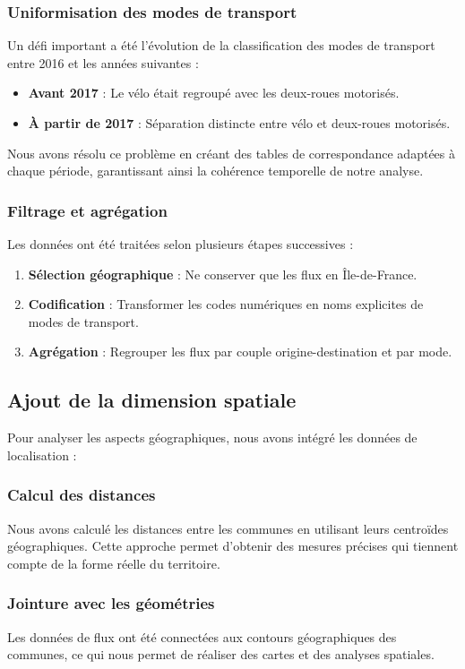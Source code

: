 \documentclass[11pt,a4paper]{article}
\begin{document}
\subsubsection{Uniformisation des modes de transport}
Un défi important a été l'évolution de la classification des modes de transport entre 2016 et les années suivantes :
\begin{itemize}[label=\textbullet]
    \item \textbf{Avant 2017} : Le vélo était regroupé avec les deux-roues motorisés.
    \item \textbf{À partir de 2017} : Séparation distincte entre vélo et deux-roues motorisés.
\end{itemize}
Nous avons résolu ce problème en créant des tables de correspondance adaptées à chaque période, garantissant ainsi la cohérence temporelle de notre analyse.
\subsubsection{Filtrage et agrégation}
Les données ont été traitées selon plusieurs étapes successives :
\begin{enumerate}[label=\textbf{\arabic*.}]
    \item \textbf{Sélection géographique} : Ne conserver que les flux en Île-de-France.
    \item \textbf{Codification} : Transformer les codes numériques en noms explicites de modes de transport.
    \item \textbf{Agrégation} : Regrouper les flux par couple origine-destination et par mode.
\end{enumerate}
\subsection{Ajout de la dimension spatiale}
Pour analyser les aspects géographiques, nous avons intégré les données de localisation :
\subsubsection{Calcul des distances}
Nous avons calculé les distances entre les communes en utilisant leurs centroïdes géographiques. Cette approche permet d'obtenir des mesures précises qui tiennent compte de la forme réelle du territoire.
\subsubsection{Jointure avec les géométries}
Les données de flux ont été connectées aux contours géographiques des communes, ce qui nous permet de réaliser des cartes et des analyses spatiales.
\end{document}
